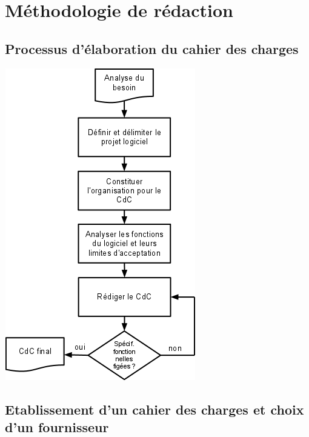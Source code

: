 \documentclass{mise_en_page}
\begin{document}
\section[Méthodologie de rédaction]{Méthodologie de
rédaction}


\subsection[Processus d’élaboration du cahier des
charges]{Processus d’élaboration du cahier des charges}

\includegraphics[width=8.308cm,height=13.6cm]{BP22020Aide20C3A020la20rC3A9daction20dun20CdC20Logiciel-img1.png}

\subsection[Etablissement d’un cahier des charges et choix d’un
fournisseur]{Etablissement d’un cahier des charges et choix
d’un fournisseur}
\end{document}
